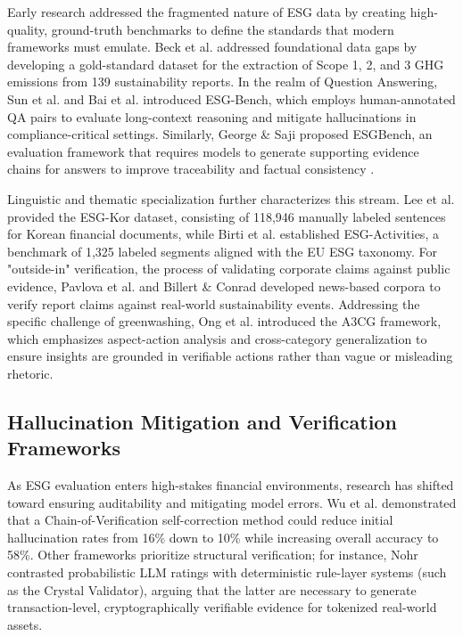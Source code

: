 Early research addressed the fragmented nature of ESG data by creating high-quality, ground-truth benchmarks to define the standards that modern frameworks must emulate. Beck et al.  \parencite{jacob_beck_9548a833} addressed foundational data gaps by developing a gold-standard dataset for the extraction of Scope 1, 2, and 3 GHG emissions from 139 sustainability reports. In the realm of Question Answering, Sun et al.  \parencite{siqi_sun_f6a51152} and Bai et al.  \parencite{association_for_artificial_intelligence_2026_86e12eae} introduced ESG-Bench, which employs human-annotated QA pairs to evaluate long-context reasoning and mitigate hallucinations in compliance-critical settings. Similarly, George \& Saji  \parencite{s__s__george_saji_b30d4b3e} proposed ESGBench, an evaluation framework that requires models to generate supporting evidence chains for answers to improve traceability and factual consistency  \parencite{s__s__george_saji_b30d4b3e}.

Linguistic and thematic specialization further characterizes this stream. Lee et al.  \parencite{jaeyoung_lee_1894333c} provided the ESG-Kor dataset, consisting of 118,946 manually labeled sentences for Korean financial documents, while Birti et al.  \parencite{mattia_birti_c097e3e8} established ESG-Activities, a benchmark of 1,325 labeled segments aligned with the EU ESG taxonomy. For "outside-in" verification, the process of validating corporate claims against public evidence, Pavlova et al.  \parencite{mariya_pavlova_259be499} and Billert \& Conrad  \parencite{fabian_billert_a5fbb687} developed news-based corpora to verify report claims against real-world sustainability events. Addressing the specific challenge of greenwashing, Ong et al.  \parencite{keane_ong_0a5de439} introduced the A3CG framework, which emphasizes aspect-action analysis and cross-category generalization to ensure insights are grounded in verifiable actions rather than vague or misleading rhetoric.
\subsection{Hallucination Mitigation and Verification Frameworks}

As ESG evaluation enters high-stakes financial environments, research has shifted toward ensuring auditability and mitigating model errors. Wu et al.  \parencite{yue_wu_cae353aa} demonstrated that a Chain-of-Verification self-correction method could reduce initial hallucination rates from 16\% down to 10\% while increasing overall accuracy to 58\%. Other frameworks prioritize structural verification; for instance, Nohr  \parencite{steven_paul_nohr_a6874924} contrasted probabilistic LLM ratings with deterministic rule-layer systems (such as the Crystal Validator), arguing that the latter are necessary to generate transaction-level, cryptographically verifiable evidence for tokenized real-world assets.

